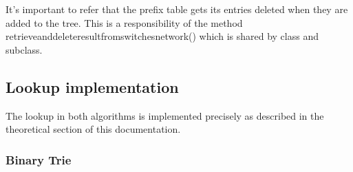 \documentclass[]{report}
\begin{document}
\begin{minipage}{\linewidth}%

\label{fig:print_controller2}
\end{minipage}

It’s important to refer that the prefix table gets its entries deleted when they are added to the tree. This is a responsibility of the method retrieve\textunderscore and\textunderscore delete\textunderscore result\textunderscore from\textunderscore switches\textunderscore network() which is shared by class and subclass.

\subsection{Lookup implementation}

The lookup in both algorithms is implemented precisely as described in the theoretical section of this documentation.

\subsubsection{Binary Trie}
\end{document}
